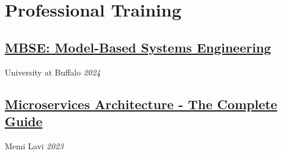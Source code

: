 %
%
%
\section{Professional Training}
%
%
\subsection{\href{https://www.coursera.org/account/accomplishments/verify/KQKRA2UXQ87B}{MBSE: Model-Based Systems Engineering}}
University at Buffalo \textit{2024}
\subsection{\href{https://www.udemy.com/certificate/UC-a8db49e4-26b6-4fa6-b156-d1cc5423de7f/}{Microservices Architecture - The Complete Guide}}
Memi Lavi \textit{2023}

